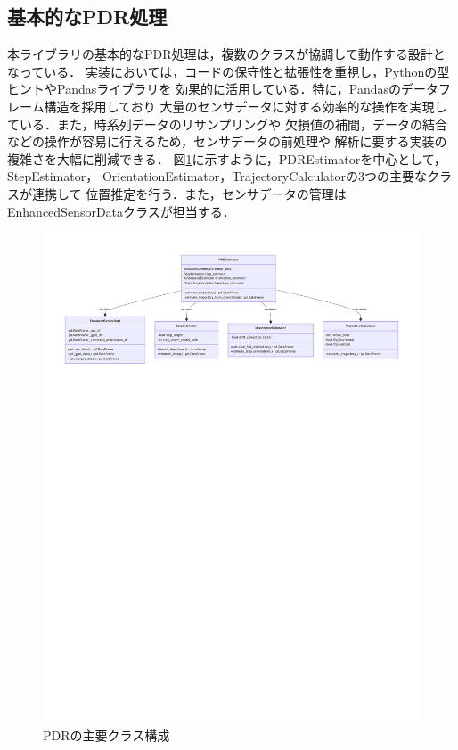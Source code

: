 
\subsection{基本的なPDR処理}

本ライブラリの基本的なPDR処理は，複数のクラスが協調して動作する設計となっている．
実装においては，コードの保守性と拡張性を重視し，Pythonの型ヒントやPandasライブラリを
効果的に活用している．特に，Pandasのデータフレーム構造を採用しており
大量のセンサデータに対する効率的な操作を実現している．また，時系列データのリサンプリングや
欠損値の補間，データの結合などの操作が容易に行えるため，センサデータの前処理や
解析に要する実装の複雑さを大幅に削減できる．
図\ref{fig:pdr-class}に示すように，PDREstimatorを中心として，StepEstimator，
OrientationEstimator，TrajectoryCalculatorの3つの主要なクラスが連携して
位置推定を行う．また，センサデータの管理はEnhancedSensorDataクラスが担当する．

\begin{figure}[H]
    \centering
    \includegraphics[width=\linewidth]{image/pdr-class-diagram.pdf}
    \caption{PDRの主要クラス構成}
    \label{fig:pdr-class}
\end{figure}

